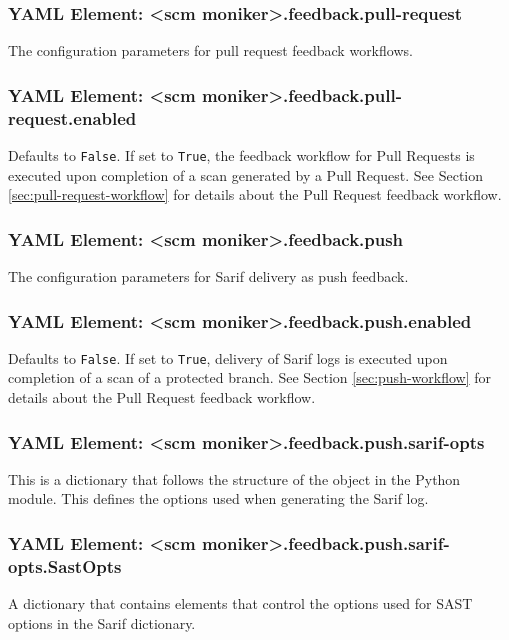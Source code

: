 \subsubsection{YAML Element: <scm moniker>.feedback.pull-request}\label{sec:yaml-feedback-pull-request}
The configuration parameters for pull request feedback workflows.

\subsubsection{YAML Element: <scm moniker>.feedback.pull-request.enabled}\label{sec:yaml-pull-request-enabled}
Defaults to \texttt{False}.  If set to \texttt{True}, the feedback workflow for Pull Requests is executed upon completion of a scan generated by
a Pull Request. See Section \ref{sec:pull-request-workflow} for details about the Pull Request feedback workflow.


\subsubsection{YAML Element: <scm moniker>.feedback.push}\label{sec:yaml-feedback-push}
The configuration parameters for Sarif delivery as push feedback.

\subsubsection{YAML Element: <scm moniker>.feedback.push.enabled}\label{sec:yaml-push-enabled}
Defaults to \texttt{False}.  If set to \texttt{True}, delivery of Sarif logs is executed upon completion of a scan
of a protected branch. See Section \ref{sec:push-workflow} for details about the Pull Request feedback workflow.

\subsubsection{YAML Element: <scm moniker>.feedback.push.sarif-opts}\label{sec:yaml-push-sarif-opts}
This is a dictionary that follows the structure of the 
object in the \cxonesarif Python module.  This defines the options used when generating the Sarif log.

\subsubsection{YAML Element: <scm moniker>.feedback.push.sarif-opts.SastOpts}\label{sec:yaml-push-sarif-opts-sastopts}
A dictionary that contains elements that control the options used for SAST options in the Sarif dictionary.

